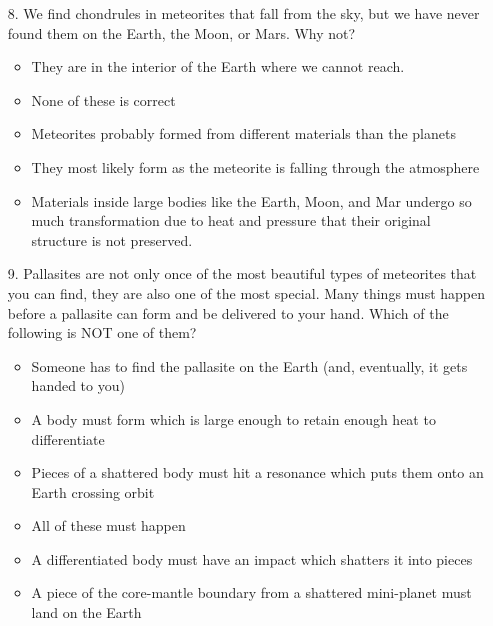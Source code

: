 \begin{enumerate}
\begin{multicols}{2}
\begin{itemize}[label={$\bullet$}]
        \item The technique requires finding parts of the meteorite with different abundances of lead and trying to determine how much extra lead exists because of uranium decay
        \item Objects which are younger will have more lead-207 than objects which are older.
    \end{itemize}\end{multicols}   
    \item[8.] We find chondrules in meteorites that fall from the sky, but we have never found them on the Earth, the Moon, or Mars. Why not?
    \begin{multicols}{2} \begin{itemize}[label={$\bullet$}]
        \item They are in the interior of the Earth where we cannot reach.
        \item None of these is correct
        \item Meteorites probably formed from different materials than the planets
        \item They most likely form as the meteorite is falling through the atmosphere
        \item Materials inside large bodies like the Earth, Moon, and Mar undergo so much transformation due to heat and pressure that their original structure is not preserved.
    \end{itemize}\end{multicols}   
    \item[9.]  Pallasites are not only once of the most beautiful types of meteorites that you can find, they are also one of the most special. Many things must happen before a pallasite can form and be delivered to your hand. Which of the following is NOT one of them?
    \begin{multicols}{2} \begin{itemize}[label={$\bullet$}]
        \item Someone has to find the pallasite on the Earth (and, eventually, it gets handed to you)
        \item A body must form which is large enough to retain enough heat to differentiate
        \item Pieces of a shattered body must hit a resonance which puts them onto an Earth crossing orbit
        \item All of these must happen
        \item A differentiated body must have an impact which shatters it into pieces
        \item A piece of the core-mantle boundary from a shattered mini-planet must land on the Earth
    \end{itemize}\end{multicols}   
\end{enumerate}

